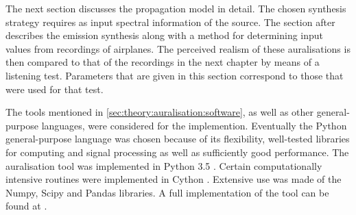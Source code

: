 The next section discusses the propagation model in detail. The chosen synthesis
strategy requires as input spectral information of the source. The section after
describes the emission synthesis along with a method
for determining input values from recordings of airplanes. The perceived realism
of these auralisations is then compared to that of the recordings in the next
chapter by means of a listening test. Parameters that are given in this section
correspond to those that were used for that test.

The tools mentioned in \ref{sec:theory:auralisation:software}, as well as other
general-purpose languages, were considered for the implemention.
Eventually the Python general-purpose language was chosen because of its flexibility,
well-tested libraries for computing and signal processing as well as sufficiently good
performance. The auralisation tool was implemented in Python 3.5 \cite{Python}.
Certain computationally intensive routines were implemented in Cython \cite{Behnel2011,Cython}.
Extensive use was made of the Numpy\cite{VanderWalt2011,Numpy}, Scipy\cite{Scipy} and
Pandas\cite{Mckinney2010} libraries. A full implementation of the tool can be
found at \cite{Rietdijk2017d}.
